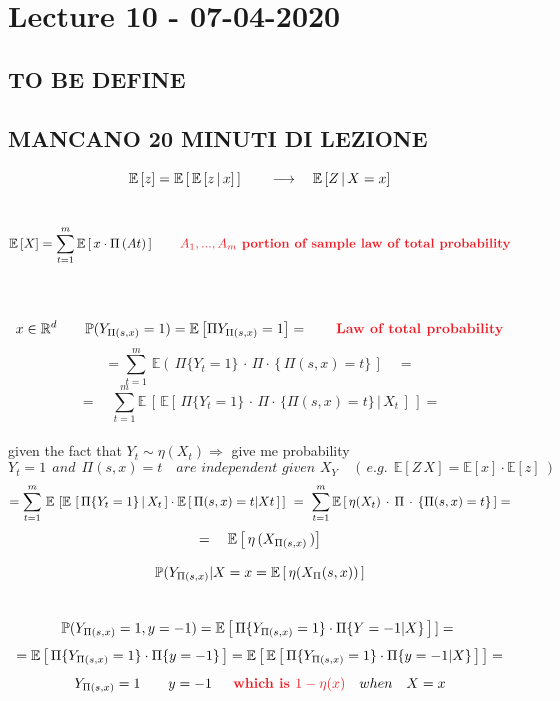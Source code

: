 \documentclass[../main.tex]{subfiles}
\begin{document}
\chapter{Lecture 10 - 07-04-2020}
\section{TO BE DEFINE}


\section{MANCANO 20 MINUTI DI LEZIONE}
$$ \mathbb{E}\left[z\right] = \mathbb{E}\left[ \, \mathbb{E} \left[ z\, |\, x \right]\, \right] \qquad \longrightarrow \quad \mathbb{E} \left[ Z \, | \, X= x \right] $$
\
$$\barra{E}\left[X\right] = \sum_{t = 1}^{m} \barra{E}\left[\, x \cdot \Pi\left(A\begin{small}
t \end{small} \right) \, \right] \qquad \bred{$A_1,..., A_m$ portion of sample law of total probability}$$
\\\
$$x \in \mathbb{R}^d \qquad
\mathbb{P}(Y_{\Pi(s,x)} = 1) = \\\\ \mathbb{E}\left[\Pi { Y_{\Pi(s,x)} = 1 } \right] = \qquad \bred{Law of total probability} 
$$
$$
= \sum_{t = 1}^{m} \, \mathbb{E}\left(\,\Pi\{Y_t = 1\} \, \cdot \, \Pi \cdot \, \{ \, \Pi(s,x) = t \} \, \right] \quad  =
$$
$$
= \quad \sum_{t = 1}^{m} \mathbb{E} \, \left[ \, \mathbb{E}\left[\,\Pi\{Y_t = 1\} \, \cdot \, \Pi \cdot \, \{\Pi(s,x) = t\}\, |\, X_t \, \right] \, \right] =
$$\\
given the fact that $Y_t \sim \eta(X_t) \Rightarrow$ give me probability \\
$$
Y_t = 1 \ \ and \ \ \Pi(s,x) = t \quad \textit{are independent given $X_Y$} \quad \left( \, e. g. \ \ \mathbb{E}\left[ Z\, X \right] = \mathbb{E}\left[x\right] \cdot \mathbb{E}\left[z \right] \  \right)
$$
$$
= \sum_{t = 1}^{m} \, \mathbb{E}\, \left[\mathbb{E} \, \left[ \,\Pi\{Y_t = 1\}\,|\,X_t \, \right] \cdot \mathbb{E} \left[ \, \Pi(s,x) = t | Xt \, \right] \, \right] \
= \ \sum_{t = 1}^{m} \mathbb{E}\left[\, \eta(X_t) \, \cdot \, \Pi \, \cdot \, \{\Pi (s,x) = t \} \, \right] = 
$$
$$
= \quad \mathbb{E} \left[ \, \eta \, (X_{\Pi(s,x)}\,)\right]
$$

$$ \mathbb{P} (Y_{\Pi(s,x)}| X=x = \mathbb{E}\left[\, \eta(X_\Pi (s,x)) \, \right] 
$$
\\

$$
\mathbb{P} (Y_{\Pi(s,x)} = 1, y = -1 ) = 
 \mathbb{E}\left[ \, \Pi\{Y_{\Pi(s,x)  }= 1\} \cdot \Pi \{Y= -1|X\} \, \right]\, ] =  \
$$
$$
= \mathbb{E}\left[ \, \Pi \{ Y_{\Pi(s,x)} = 1\} \cdot \Pi\{ y = -1 \} \, \right] 
= \mathbb{E}\left[ \, \mathbb{E}\left[ \,\Pi \{ Y_{\Pi(s,x)} = 1\} \cdot \Pi \{ y = -1 | X \} \, \right]\, \right] = 
$$
$$
 Y_{\Pi(s,x)} = 1  \quad \quad y = -1 \bred{ \quad which is $ 1- \eta(x)$} \quad when \quad X = x 
$$
\end{document}
